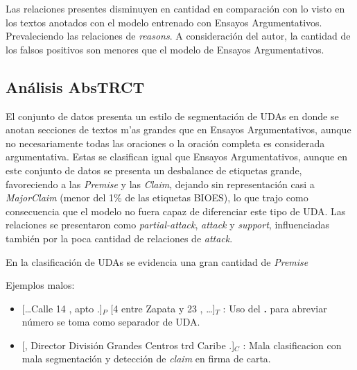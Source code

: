 Las relaciones presentes disminuyen en cantidad en comparación con lo visto en los textos anotados con el modelo 
entrenado con Ensayos Argumentativos. Prevaleciendo las relaciones de \emph{reasons}. A consideración del autor,
la cantidad de los falsos positivos son menores que el modelo de Ensayos Argumentativos.

\subsection{Análisis AbsTRCT}


El conjunto de datos presenta un estilo de segmentación de UDAs en donde se anotan 
secciones de textos m'as grandes que en Ensayos Argumentativos, aunque no necesariamente 
todas las oraciones o la oración completa es considerada argumentativa. 
Estas se clasifican igual que Ensayos Argumentativos, aunque 
en este conjunto de datos se presenta un desbalance de etiquetas grande, favoreciendo 
a las \emph{Premise} y las \emph{Claim}, dejando sin representación casi a \emph{MajorClaim}
(menor del 1\% de las etiquetas BIOES), lo que trajo como consecuencia que el modelo no fuera 
capaz de diferenciar este tipo de UDA. Las relaciones se presentaron como \emph{partial-attack},
\emph{attack} y \emph{support}, influenciadas también por la poca cantidad de relaciones de \emph{attack}.

En la clasificación de UDAs se evidencia una gran cantidad de \emph{Premise}

Ejemplos malos:
\begin{itemize}
	\item \text{} [\dots Calle 14 , apto .]$_P$ [4 entre Zapata y 23 , \dots]$_T$ 
	: Uso del \textbf{.} para abreviar número se toma como separador de UDA. %
	\item \text{} [, Director División Grandes Centros trd Caribe .]$_C$ 
	: Mala clasificacion con mala segmentación y detección de \emph{claim} en firma de carta. 
\end{itemize}

